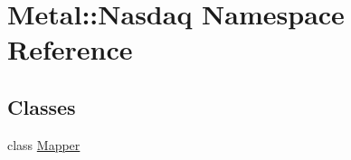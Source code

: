 \hypertarget{namespaceMetal_1_1Nasdaq}{}\section{Metal\+:\+:Nasdaq Namespace Reference}
\label{namespaceMetal_1_1Nasdaq}
\subsection*{Classes}
\begin{DoxyCompactItemize}
\item 
class \hyperlink{classMetal_1_1Nasdaq_1_1Mapper}{Mapper}
\end{DoxyCompactItemize}
